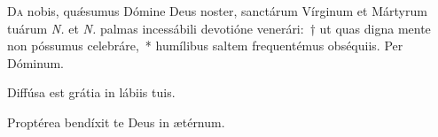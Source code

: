 \documentclass[vesperale_romanum.tex]{subfiles}
\begin{document}
\oratio

\lettrine{D}{a} nobis, quǽsumus Dómine Deus noster, san\-ctárum Vírginum et Mártyrum tuárum \textit{N.} et \textit{N.} palmas incessábili devotióne venerári:~† ut quas digna mente non póssumus celebráre,~* humílibus saltem frequentémus obséquiis. Per Dóminum.


\omniapraeter %

\vv Diffúsa est grátia in lábiis tuis. \tpalleluia

\rr Proptérea bendíxit te Deus in ætérnum. \tpalleluia
\label{an_veni_sponsa_christi_ii_vesperis_solesmes_1961}
{}
\end{document}
